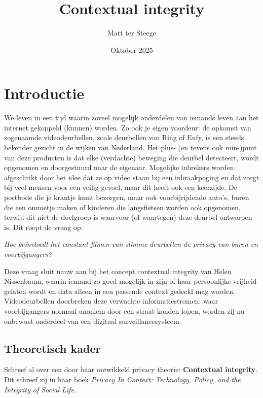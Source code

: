\documentclass[nonacm,sigconf]{acmart}
\title{Contextual integrity}
\date{} %
\author{Matt ter Steege}
\date{Oktober 2025}
\affiliation{
    \institution{Universiteit Utrecht, 9932003}
    \city{Utrecht}
    \country{Nederland}
}
\newcommand{\vertspace}{\vspace{0.05in}}
\newcommand{\question}[1]{\vertspace\begin{center}\parbox{0.8\linewidth}{\centering\textit{#1}}\end{center}\vertspace}
\begin{document}
    \maketitle

    \section{Introductie}
    We leven in een tijd waarin zoveel mogelijk onderdelen van iemands leven aan het internet gekoppeld (kunnen) worden.
    Zo ook je eigen voordeur: de opkomst van zogenaamde videodeurbellen, zoals deurbellen van Ring of Eufy, is een steeds bekender gezicht in de wijken van Nederland.
    Het plus- (en tevens ook min-)punt van deze producten is dat elke (verdachte) beweging die deurbel detecteert, wordt opgenomen en doorgestuurd naar de eigenaar.
    Mogelijke inbrekers worden afgeschrikt door het idee dat ze op video staan bij een inbraakpoging en dat zorgt bij veel mensen voor een veilig gevoel, maar dit heeft ook een keerzijde.
    De postbode die je krantje komt bezorgen, maar ook voorbijrijdende auto’s, buren die een ommetje maken of kinderen die langsfietsen worden ook opgenomen, terwijl dit niet de doelgroep is waarvoor (of waartegen) deze deurbel ontworpen is.
    Dit roept de vraag op:

    \question{Hoe beïnvloedt het constant filmen van slimme deurbellen de privacy van buren en voorbijgangers?}

    Deze vraag sluit nauw aan bij het concept contextual integrity van Helen Nissenbaum, waarin iemand zo goed mogelijk in zijn of haar persoonlijke vrijheid gelaten wordt en data alleen in een passende context gedeeld mag worden.
    Videodeurbellen doorbreken deze verwachte informatiestromen: waar voorbijgangers normaal anoniem door een straat konden lopen, worden zij nu onbewust onderdeel van een digitaal surveillancesysteem.

    \subsection{Theoretisch kader}

    \parencite{nissenbaum2009privacy} Schreef al over een door haar ontwikkeld privacy theorie: \textbf{Contextual integrity}.
    Dit schreef zij in haar boek \textit{Privacy In Context: Technology, Policy, and the Integrity of Social Life.}
\end{document}
